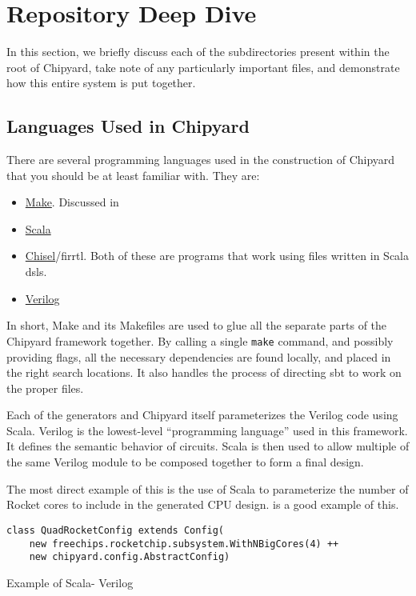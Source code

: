 \chapter{Repository Deep Dive}\label{chap:Repository_Deep_Dive}
In this section, we briefly discuss each of the subdirectories present within the root of Chipyard, take note of any particularly important files, and demonstrate how this entire system is put together.

\section{Languages Used in Chipyard}\label{sec:Langs_used_in_Chipyard}
There are several programming languages used in the construction of Chipyard that you should be at least familiar with.
They are:
\begin{itemize}
\item \href{https://www.gnu.org/software/make/}{Make}.
  Discussed in 
\item \href{https://www.scala-lang.org/}{Scala}
\item \href{https://www.chisel-lang.org/}{Chisel}/\Gls{firrtl}.
  Both of these are programs that work using files written in Scala \glspl{dsl}.
\item \href{https://en.wikipedia.org/wiki/Verilog}{Verilog}
\end{itemize}

In short, Make and its Makefiles are used to glue all the separate parts of the Chipyard framework together.
By calling a single \texttt{make} command, and possibly providing flags, all the necessary dependencies are found locally, and placed in the right search locations.
It also handles the process of directing \gls{sbt} to work on the proper files.

Each of the generators and Chipyard itself parameterizes the Verilog code using Scala.
Verilog is the lowest-level ``programming language'' used in this framework.
It defines the semantic behavior of circuits.
Scala is then used to allow multiple of the same Verilog module to be composed together to form a final design.

The most direct example of this is the use of Scala to parameterize the number of Rocket cores to include in the generated CPU design.
 is a good example of this.

\begin{listing}[h!tbp]
\begin{verbatim}
class QuadRocketConfig extends Config(
    new freechips.rocketchip.subsystem.WithNBigCores(4) ++
    new chipyard.config.AbstractConfig)
\end{verbatim}
\caption{Example of Scala- Verilog}
\label{lst:Scala_Parameterized_Verilog}
\end{listing}

